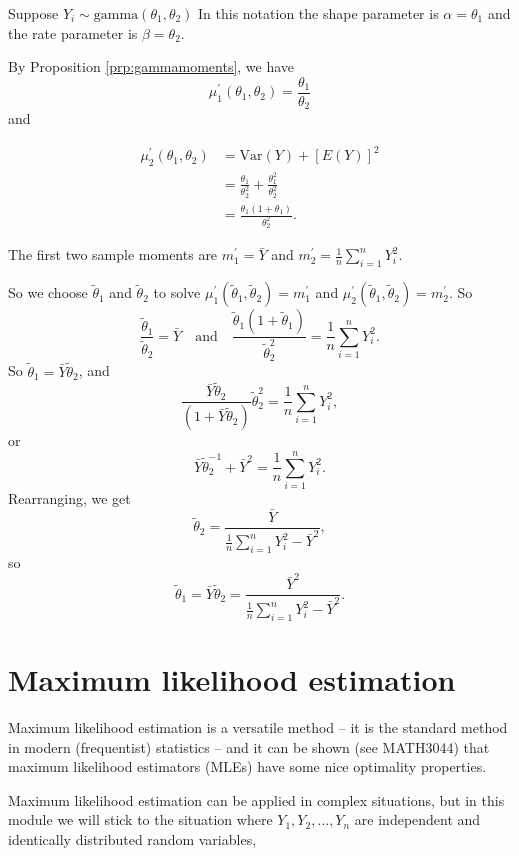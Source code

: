 \documentclass[]{book}
\theoremstyle{definition}
\theoremstyle{definition}
\theoremstyle{definition}
\theoremstyle{remark}
\let\BeginKnitrBlock\begin \let\EndKnitrBlock\end
\begin{document}
\BeginKnitrBlock{example}
\protect\hypertarget{exm:unnamed-chunk-96}{}{\label{exm:unnamed-chunk-96}
}Suppose \(Y_i \sim \text{gamma}(\theta_1, \theta_2)\) In this notation
the shape parameter is \(\alpha = \theta_1\) and the rate parameter is
\(\beta = \theta_2\).

By Proposition \ref{prp:gammamoments}, we have
\[\mu_1^\prime(\theta_1, \theta_2) = \frac{\theta_1}{\theta_2}\] and

\begin{align*}
\mu_2^\prime(\theta_1, \theta_2) &= 
\text{Var}(Y) + [E(Y)]^2 \\
&= \frac{\theta_1}{\theta_2^2} + \frac{\theta_1^2}{\theta_2^2} \\
&= \frac{\theta_1(1 + \theta_1)}{\theta_2^2}.
\end{align*}

The first two sample moments are \(m_1^\prime = \bar Y\) and
\(m_2^\prime = \frac{1}{n}\sum_{i=1}^n Y_i^2\).

So we choose \(\tilde \theta_1\) and \(\tilde \theta_2\) to solve
\(\mu_1^\prime(\tilde \theta_1, \tilde \theta_2) = m_1^\prime\) and
\(\mu_2^\prime(\tilde \theta_1, \tilde \theta_2) = m_2^\prime\). So
\[\frac{\tilde \theta_1}{\tilde \theta_2} = \bar Y
\quad \text{and} \quad
\frac{\tilde \theta_1(1 + \tilde \theta_1)}{\tilde \theta_2^2} = \frac{1}{n}\sum_{i=1}^n Y_i^2.\]
So \(\tilde \theta_1 = \bar Y \tilde \theta_2\), and
\[\frac{\bar Y \tilde \theta_2}{(1 + \bar Y \tilde \theta_2)}{\tilde \theta_2^2} = \frac{1}{n}\sum_{i=1}^n Y_i^2,\]
or
\[\bar Y \tilde{\theta}_2^{-1} + {\bar Y}^2 = \frac{1}{n}\sum_{i=1}^n Y_i^2.\]
Rearranging, we get
\[\tilde \theta_2 = \frac{\bar Y}{\frac{1}{n}\sum_{i=1}^n Y_i^2 - {\bar Y}^2},\]
so
\[\tilde \theta_1 = \bar Y \tilde \theta_2 = \frac{\bar Y^2}{\frac{1}{n}\sum_{i=1}^n Y_i^2 - {\bar Y}^2}.\]
\EndKnitrBlock{example}

\section{Maximum likelihood
estimation}\label{maximum-likelihood-estimation}

Maximum likelihood estimation is a versatile method -- it is the
standard method in modern (frequentist) statistics -- and it can be
shown (see MATH3044) that maximum likelihood estimators (MLEs) have some
nice optimality properties.

Maximum likelihood estimation can be applied in complex situations, but
in this module we will stick to the situation where
\(Y_1, Y_2, \ldots, Y_n\) are independent and identically distributed
random variables,
\end{document}
